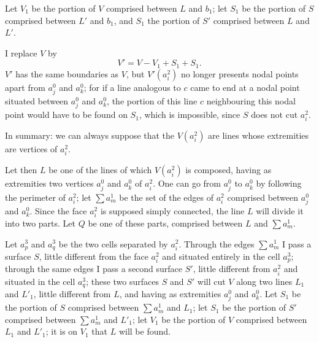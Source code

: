 \documentclass{article}
\begin{document}
Let $V_{1}$ be the portion of $V$ comprised between $L$ and $b_{1}$; let $S_{1}$ be the portion of $S$ comprised between $L'$ and $b_{1}$, and $S_{1}$ the portion of $S'$ comprised between $L$ and $L'$.

I replace $V$ by
\[ V' = V - V_{1} + S_{1} + S_{1}. \]
$V'$ has the same boundaries as $V$, but $V'(a^{2}_{i})$ no longer presents nodal points apart from $a^{0}_{j}$ and $a^{0}_{k}$; for if a line analogous to $c$ came to end at a nodal point situated between $a^{0}_{j}$ and $a^{0}_{k}$, the portion of this line $c$ neighbouring this nodal point would have to be found on $S_{1}$, which is impossible, since $S$ does not cut $a^{2}_{i}$.

In summary: we can always suppose that the $V(a^{2}_{i})$ are lines whose extremities are vertices of $a^{2}_{i}$.

Let then $L$ be one of the lines of which $V(a^{2}_{i})$ is composed, having as extremities two vertices $a^{0}_{j}$ and $a^{0}_{k}$ of $a^{2}_{i}$. One can go from $a^{0}_{j}$ to $a^{0}_{k}$ by following the perimeter of $a^{2}_{i}$; let $\displaystyle\sum a^{1}_{m}$ be the set of the edges of $a^{2}_{i}$ comprised between $a^{0}_{j}$ and $a^{0}_{k}$. Since the face $a^{2}_{i}$ is supposed simply connected, the line $L$ will divide it into two parts. Let $Q$ be one of these parts, comprised between $L$ and $\displaystyle\sum a^{1}_{m}$.

Let $a^{3}_{p}$ and $a^{3}_{q}$ be the two cells separated by $a^{2}_{i}$. Through the edges $\displaystyle\sum a^{1}_{m}$ I pass a surface $S$, little different from the face $a^{2}_{i}$ and situated entirely in the cell $a^{3}_{p}$; through the same edges I pass a second
surface $S'$, little different from $a^{2}_{i}$ and situated in the cell $a^{3}_{q}$; these two surfaces $S$ and $S'$ will cut $V$ along two lines $L_{1}$ and $L'_{1}$, little different from $L$, and having as extremities $a^{0}_{j}$ and $a^{0}_{k}$. Let $S_{1}$ be the portion of $S$ comprised between $\displaystyle\sum a^{1}_{m}$ and $L_{1}$; let $S_{1}$ be the portion of $S'$ comprised between $\displaystyle\sum a^{1}_{m}$ and $L'_{1}$; let $V_{1}$ be the portion of $V$ comprised between $L_{1}$ and $L'_{1}$; it is on $V_{1}$ that $L$ will be found.
\end{document}
